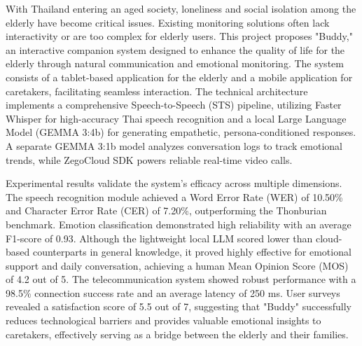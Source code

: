 \hspace*{1.6cm}With Thailand entering an aged society, loneliness and social isolation among the elderly have become critical issues. Existing monitoring solutions often lack interactivity or are too complex for elderly users. This project proposes "Buddy," an interactive companion system designed to enhance the quality of life for the elderly through natural communication and emotional monitoring. The system consists of a tablet-based application for the elderly and a mobile application for caretakers, facilitating seamless interaction. The technical architecture implements a comprehensive Speech-to-Speech (STS) pipeline, utilizing Faster Whisper for high-accuracy Thai speech recognition and a local Large Language Model (GEMMA 3:4b) for generating empathetic, persona-conditioned responses. A separate GEMMA 3:1b model analyzes conversation logs to track emotional trends, while ZegoCloud SDK powers reliable real-time video calls.

\hspace*{1.6cm}Experimental results validate the system's efficacy across multiple dimensions. The speech recognition module achieved a Word Error Rate (WER) of 10.50\% and Character Error Rate (CER) of 7.20\%, outperforming the Thonburian benchmark. Emotion classification demonstrated high reliability with an average F1-score of 0.93. Although the lightweight local LLM scored lower than cloud-based counterparts in general knowledge, it proved highly effective for emotional support and daily conversation, achieving a human Mean Opinion Score (MOS) of 4.2 out of 5. The telecommunication system showed robust performance with a 98.5\% connection success rate and an average latency of 250 ms. User surveys revealed a satisfaction score of 5.5 out of 7, suggesting that "Buddy" successfully reduces technological barriers and provides valuable emotional insights to caretakers, effectively serving as a bridge between the elderly and their families.